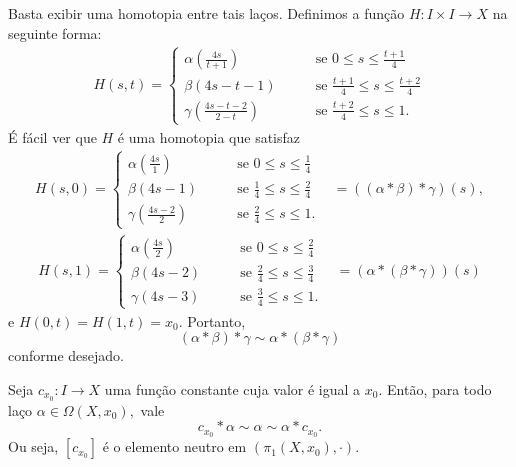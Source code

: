 \begin{dem}
    Basta exibir uma homotopia entre tais laços. Definimos a função $H:I\times I\rightarrow X$ na seguinte forma:
    \begin{align*}
        H(s,t)=\begin{cases}
            \alpha(\frac{4s}{t+1})\;\;\;&\;\;\;\mbox{ se }0\le s \le \frac{t+1}{4}\\
            \beta(4s-t-1)\;\;\;&\;\;\;\mbox{ se }\frac{t+1}{4}\le s\le\frac{t+2}{4}\\
            \gamma(\frac{4s-t-2}{2-t})\;\;\;&\;\;\;\mbox{ se }\frac{t+2}{4}\le s\le 1.
        \end{cases}
    \end{align*}
    É fácil ver que $H$ é uma homotopia que satisfaz
    \begin{align*}
        H(s,0)=\begin{cases}
            \alpha(\frac{4s}{1})\;\;\;&\;\;\;\mbox{ se }0\le s \le \frac{1}{4}\\
            \beta(4s-1)\;\;\;&\;\;\;\mbox{ se }\frac{1}{4}\le s\le\frac{2}{4}\\
            \gamma(\frac{4s-2}{2})\;\;\;&\;\;\;\mbox{ se }\frac{2}{4}\le s\le 1.
        \end{cases}\;\;\;=((\alpha*\beta)*\gamma)(s),
    \end{align*}
    \begin{align*}
        H(s,1)=\begin{cases}
            \alpha(\frac{4s}{2})\;\;\;&\;\;\;\mbox{ se }0\le s \le \frac{2}{4}\\
            \beta(4s-2)\;\;\;&\;\;\;\mbox{ se }\frac{2}{4}\le s\le\frac{3}{4}\\
            \gamma(4s-3)\;\;\;&\;\;\;\mbox{ se }\frac{3}{4}\le s\le 1.
        \end{cases}\;\;\;=(\alpha*(\beta*\gamma))(s)
    \end{align*}
    e $H(0,t)=H(1,t)=x_0.$ Portanto, $$(\alpha*\beta)*\gamma\sim \alpha*(\beta*\gamma)$$ conforme desejado.
\end{dem}

\begin{lemma}
    Seja $c_{x_0}:I\rightarrow X$ uma função constante cuja valor é igual a $x_0.$ Então, para todo laço $\alpha\in \Omega(X,x_0),$ vale
    $$c_{x_0}*\alpha\sim\alpha\sim\alpha*c_{x_0}.$$
    Ou seja, $[c_{x_0}]$ é o elemento neutro em $(\pi_1(X,x_0),\cdot)$.
\end{lemma}

